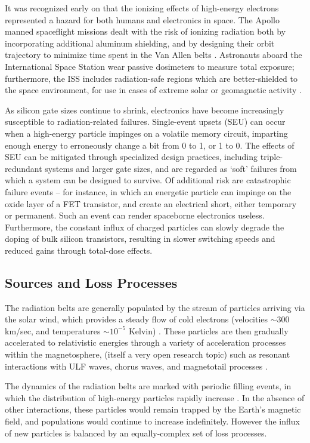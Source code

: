 It was recognized early on that the ionizing effects of high-energy electrons represented a hazard for both humans and electronics in space. The Apollo manned spaceflight missions dealt with the risk of ionizing radiation both by incorporating additional aluminum shielding, and by designing their orbit trajectory to minimize time spent in the Van Allen belts \citep{Apollo1973}. Astronauts aboard the International Space Station wear passive dosimeters to measure total exposure; furthermore, the ISS includes radiation-safe regions which are better-shielded to the space environment, for use in cases of extreme solar or geomagnetic activity \citep{ugh}. 

As silicon gate sizes continue to shrink, electronics have become increasingly susceptible to radiation-related failures. Single-event upsets (SEU) can occur when a high-energy particle impinges on a volatile memory circuit, imparting enough energy to erroneously change a bit from 0 to 1, or 1 to 0. The effects of SEU can be mitigated through specialized design practices, including triple-redundant systems and larger gate sizes, and are regarded as `soft' failures from which a system can be designed to survive. Of additional risk are catastrophic failure events -- for instance, in which an energetic particle can impinge on the oxide layer of a FET transistor, and create an electrical short, either temporary or permanent. Such an event can render spaceborne electronics useless. Furthermore, the constant influx of charged particles can slowly degrade the doping of bulk silicon transistors, resulting in slower switching speeds and reduced gains through total-dose effects.

\subsection{Sources and Loss Processes}
The radiation belts are generally populated by the stream of particles arriving via the solar wind, which provides a steady flow of cold electrons (velocities $\sim 300$ km/sec, and temperatures $\sim 10^{-5}$ Kelvin) \citep{Montgomery1974, Tascione1988}. These particles are then gradually accelerated to relativistic energies through a variety of acceleration processes within the magnetosphere, (itself a very open research topic) such as resonant interactions with ULF waves, chorus waves, and magnetotail processes \citep{Shprits2006,  Bortnik2007a, Thorne2013}.

The dynamics of the radiation belts are marked with periodic filling events, in which the distribution of high-energy particles rapidly increase \citep{Horne2005, Baker2014}. In the absence of other interactions, these particles would remain trapped by the Earth's magnetic field, and populations would continue to increase indefinitely. However the influx of new particles is balanced by an equally-complex set of loss processes.

